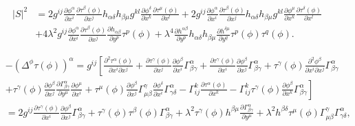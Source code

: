 \documentclass[12pt]{article}
\begin{document}
\begin{align*}
|S|^{2} &= 2 g^{ij} \frac{\partial \phi^{\alpha}}{\partial x^{i}} \frac{\partial
\tau^{\beta}(\phi)}{\partial x^{j}} h_{\alpha\delta}h_{\beta\mu} g^{kl}
\frac{\partial \phi^{\delta}}{\partial x^{k}} \frac{\partial
\tau^{\mu}(\phi)}{\partial x^{l}} +  2 g^{ij} \frac{\partial \phi^{\alpha}}{\partial
x^{i}} \frac{\partial \tau^{\beta}(\phi)}{\partial x^{j}}
h_{\alpha\delta}h_{\beta\mu} g^{kl} \frac{\partial \phi^{\mu}}{\partial x^{k}}
\frac{\partial
\tau^{\delta}(\phi)}{\partial x^{l}} \\
& + 4 \lambda^{2} g^{ij} \frac{\partial \phi^{\alpha}}{\partial x^{i}} \frac{\partial
\tau^{\beta}(\phi)}{\partial x^{j}} \frac{\partial h_{\alpha\beta}}{\partial y^{p}}
\tau^{p}(\phi) + \lambda^{4} \frac{\partial h^{\alpha\beta}}{\partial y^{p}}
h_{\alpha\delta}h_{\beta\mu} \frac{\partial h^{\delta\mu}}{\partial y^{q}}
\tau^{p}(\phi) \tau^{q}(\phi).
\end{align*}

\begin{align*}
&- (\Delta^{\phi}  \tau(\phi) )^{\alpha}= g^{ij} \left[ \frac{\partial^{2}
\tau^{\alpha}(\phi)}{\partial x^{i}\partial x^{j}}  + \frac{\partial
\tau^{\gamma}(\phi)}{\partial x^{j}} \frac{\partial \phi^{\beta}}{\partial x^{i}}
\Gamma^{\alpha}_{\beta\gamma} + \frac{\partial \tau^{\gamma}(\phi)}{\partial x^{i}}
\frac{\partial \phi^{\beta}}{\partial x^{j}} \Gamma^{\alpha}_{\beta\gamma} +
\tau^{\gamma}(\phi) \frac{\partial^{2} \phi^{\beta}}{\partial
x^{i}\partial x^{j}} \Gamma^{\alpha}_{\beta\gamma} \right.\\
  &+ \left.
\tau^{\gamma}(\phi) \frac{\partial \phi^{\beta}}{\partial x^{j}} \frac{\partial
\Gamma^{\alpha}_{\beta\gamma}}{\partial y^{\mu}} \frac{\partial \phi^{\mu}}{\partial
x^{i}} + \tau^{\mu}(\phi) \frac{\partial \phi^{\beta}}{\partial x^{j}}
\Gamma^{\gamma}_{\mu\beta} \frac{\partial \phi^{\delta}}{\partial x^{i}}
\Gamma^{\alpha}_{\gamma\delta} - \Gamma^{k}_{ij} \frac{\partial
\tau^{\alpha}(\phi)}{\partial x^{k}}
  - \Gamma^{k}_{ij} \tau^{\gamma}(\phi)
\frac{\partial \phi^{\beta}}{\partial x^{k}}
\Gamma^{\alpha}_{\beta\gamma} \right] \\
& = 2 g^{ij} \frac{\partial \tau^{\gamma}(\phi)}{\partial x^{i}} \frac{\partial
\phi^{\beta}}{\partial x^{j}} \Gamma^{\alpha}_{\beta\gamma} + \tau^{\gamma}(\phi)
\tau^{\beta}(\phi) \Gamma^{\alpha}_{\beta\gamma} + \lambda^{2} \tau^{\gamma}(\phi)
h^{\beta\mu} \frac{\partial \Gamma^{\alpha}_{\beta\gamma}}{\partial y^{\mu}} +
\lambda^{2} h^{\beta\delta}\tau^{\mu}(\phi) \Gamma^{\gamma}_{\mu\beta}
\Gamma^{\alpha}_{\gamma\delta} ,
\end{align*}
\end{document}
